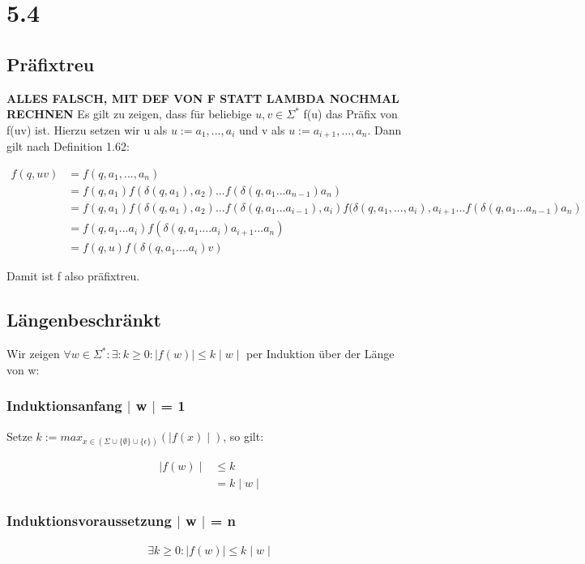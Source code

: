 \documentclass[12pt, a4paper]{article}
\begin{document}
\section*{5.4}

\subsection*{Präfixtreu}
\textbf{ALLES FALSCH, MIT DEF VON F STATT LAMBDA NOCHMAL RECHNEN}
Es gilt zu zeigen, dass für beliebige $u,v \in \Sigma^*$ f(u) das Präfix von f(uv) ist. Hierzu setzen wir u als $u := a_1,...,a_i$ und v als $u := a_{i+1},...,a_n$. Dann gilt nach Definition 1.62: 

\begin{align*}
f(q,uv) &= f(q, a_1,...,a_n) \\
&= f(q,a_1) f(\delta(q, a_1), a_2) ... f(\delta(q,a_1...a_{n-1})a_n) \\
&= f(q,a_1) f(\delta(q, a_1), a_2) ... f(\delta(q, a_1 ... a_{i-1}), a_i) f(\delta(q, a_1,..., a_i), a_{i+1} ...  f(\delta(q,a_1...a_{n-1})a_n) \\
&= f(q,a_1 ... a_i) f(\delta(q, a_1 .... a_i) a_{i+1} ... a_n) \\
&= f(q,u) f(\delta(q, a_1 .... a_i) v)
\end{align*}

Damit ist f also präfixtreu.

\subsection*{Längenbeschränkt}
Wir zeigen $\forall w \in \Sigma^*: \exists: k \ge 0: \mid f(w) \mid \le k \mid w \mid $ per Induktion über der Länge von w:

\subsubsection*{Induktionsanfang $\mid$ w $\mid$ = 1}
Setze $k := max_{x \in (\Sigma \cup \{ \emptyset \} \cup \{ \epsilon \})}( \mid f(x) \mid)$, so gilt:

\begin{align*}
\mid f(w) \mid &\le k \\
&= k \mid w \mid
\end{align*}

\subsubsection*{Induktionsvoraussetzung $\mid$ w $\mid$ = n}
\begin{align*}
\exists k \ge 0: \mid f(w) \mid \le k \mid w \mid
\end{align*}
\end{document}
